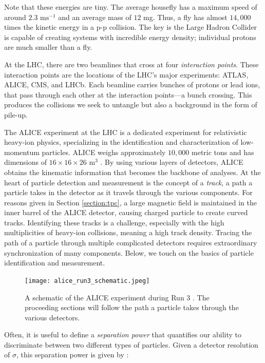 \documentclass[../main.tex]{subfiles}
\begin{document}
Note that these energies are tiny. The average housefly has a maximum speed of around $2.3$ m$\text{s}^{-1}$ and an average mass of $12$ mg. Thus, a fly has almost $14,000$ times the kinetic energy in a p-p collision. The key is the Large Hadron Collider is capable of creating systems with incredible energy density; individual protons are much smaller than a fly.  

At the LHC, there are two beamlines that cross at four \textit{interaction points}. These interaction points are the locations of the LHC's major experiments: ATLAS, ALICE, CMS, and LHCb. Each beamline carries bunches of protons or lead ions, that pass through each other at the interaction points---a bunch crossing. This produces the collisions we seek to untangle but also a background in the form of pile-up.

The ALICE experiment at the LHC is a dedicated experiment for relativistic heavy-ion physics, specializing in the identification and characterization of low-momentum particles. ALICE weighs approximately $10,000$ metric tons and has dimensions of $16\times16\times26$ $\text{m}^3$ \cite{ALICE:tdr}. By using various layers of detectors, ALICE obtains the kinematic information that becomes the backbone of analyses. At the heart of particle detection and measurement is the concept of a \textit{track}, a path a particle takes in the detector as it travels through the various components. For reasons given in Section \ref{section:tpc}, a large magnetic field is maintained in the inner barrel of the ALICE detector, causing charged particle to create curved tracks. Identifying these tracks is a challenge, especially with the high multiplicities of heavy-ion collisions, meaning a high track density. Tracing the path of a particle through multiple complicated detectors requires extraordinary synchronization of many components. Below, we touch on the basics of particle identification and measurement. 

\begin{figure}[h]
    \centering
    \texttt{[image: alice\_run3\_schematic.jpeg]}
    \caption{A schematic of the ALICE experiment during Run 3 \cite{ALICE:schematic}. The proceeding sections will follow the path a particle takes through the various detectors.}
    \label{fig:alice_schematic}
\end{figure}


Often, it is useful to define a \textit{separation power} that quantifies our ability to discriminate between two different types of particles. Given a detector resolution of $\sigma$, this separation power is given by \cite{Thomson:particle}:
\end{document}
